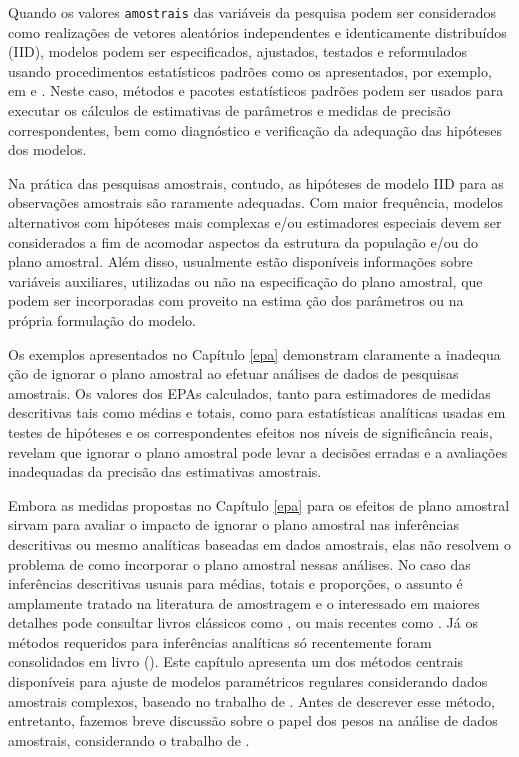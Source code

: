 \documentclass[]{book}
\numberwithin{example}{chapter}
\numberwithin{remark}{chapter}
\numberwithin{definition}{chapter}
\begin{document}
Quando os valores \texttt{amostrais} das variáveis da pesquisa podem ser
considerados como realizações de vetores aleatórios independentes e
identicamente distribuídos (IID), modelos podem ser especificados,
ajustados, testados e reformulados usando procedimentos estatísticos
padrões como os apresentados, por exemplo, em \citep{bickel} e
\citep{garthwaite}. Neste caso, métodos e pacotes estatísticos padrões
podem ser usados para executar os cálculos de estimativas de parâmetros
e medidas de precisão correspondentes, bem como diagnóstico e
verificação da adequação das hipóteses dos modelos.

Na prática das pesquisas amostrais, contudo, as hipóteses de modelo IID
para as observações amostrais são raramente adequadas. Com maior
frequência, modelos alternativos com hipóteses mais complexas e/ou
estimadores especiais devem ser considerados a fim de acomodar aspectos
da estrutura da população e/ou do plano amostral. Além disso, usualmente
estão disponíveis informações sobre variáveis auxiliares, utilizadas ou
não na especificação do plano amostral, que podem ser incorporadas com
proveito na estima ção dos parâmetros ou na própria formulação do
modelo.

Os exemplos apresentados no Capítulo \ref{epa} demonstram claramente a
inadequa ção de ignorar o plano amostral ao efetuar análises de dados de
pesquisas amostrais. Os valores dos EPAs calculados, tanto para
estimadores de medidas descritivas tais como médias e totais, como para
estatísticas analíticas usadas em testes de hipóteses e os
correspondentes efeitos nos níveis de significância reais, revelam que
ignorar o plano amostral pode levar a decisões erradas e a avaliações
inadequadas da precisão das estimativas amostrais.

Embora as medidas propostas no Capítulo \ref{epa} para os efeitos de
plano amostral sirvam para avaliar o impacto de ignorar o plano amostral
nas inferências descritivas ou mesmo analíticas baseadas em dados
amostrais, elas não resolvem o problema de como incorporar o plano
amostral nessas análises. No caso das inferências descritivas usuais
para médias, totais e proporções, o assunto é amplamente tratado na
literatura de amostragem e o interessado em maiores detalhes pode
consultar livros clássicos como \citep{cochran}, ou mais recentes como
\citep{SSW92}. Já os métodos requeridos para inferências analíticas só
recentemente foram consolidados em livro (\citep{SHS89}). Este capítulo
apresenta um dos métodos centrais disponíveis para ajuste de modelos
paramétricos regulares considerando dados amostrais complexos, baseado
no trabalho de \citep{binder87}. Antes de descrever esse método,
entretanto, fazemos breve discussão sobre o papel dos pesos na análise
de dados amostrais, considerando o trabalho de \citep{Pfeff}.
\end{document}
